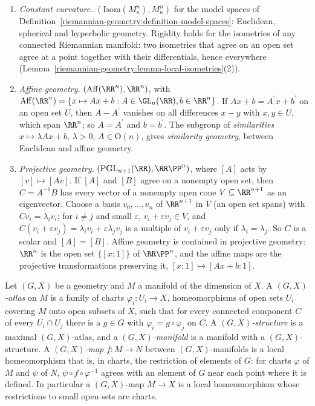 \begin{example}\label{riemannian-geometry:example-geometries}
\begin{enumerate}
\item \emph{Constant curvature.} $(\mathrm{Isom}(M^n_\kappa), M^n_\kappa)$ for the model spaces of Definition~\ref{riemannian-geometry:definition-model-spaces}: Euclidean, spherical and hyperbolic geometry. Rigidity holds for the
isometries of any connected Riemannian manifold: two isometries that agree on an open set agree at a point together with their differentials, hence everywhere (Lemma~\ref{riemannian-geometry:lemma-local-isometries}(2)).
\item \emph{Affine geometry.} $(\mathrm{Aff}(\RR^n), \RR^n)$, with $\mathrm{Aff}(\RR^n) = \{x \mapsto Ax + b : A \in \GL_n(\RR), b \in \RR^n\}$. If $Ax + b = A^{\prime}x + b^{\prime}$ on an open set $U$, then $A - A^{\prime}$ vanishes on all differences
$x - y$ with $x, y \in U$, which span $\RR^n$; so $A = A^{\prime}$ and $b = b^{\prime}$. The subgroup of \emph{similarities} $x \mapsto \lambda Ax + b$, $\lambda > 0$, $A \in \mathrm{O}(n)$, gives \emph{similarity geometry}, between
Euclidean and affine geometry.
\item \emph{Projective geometry.} $(\mathrm{PGL}_{n+1}(\RR), \RR\PP^n)$, where $[A]$ acts by $[v] \mapsto [Av]$. If $[A]$ and $[B]$ agree on a nonempty open set, then $C = A^{-1}B$ has every vector of a nonempty open cone
$V \subseteq \RR^{n+1}$ as an eigenvector. Choose a basis $v_0, \ldots, v_n$ of $\RR^{n+1}$ in $V$ (an open set spans) with $Cv_i = \lambda_iv_i$; for $i \neq j$ and small $\varepsilon$, $v_i + \varepsilon v_j \in V$, and
$C(v_i + \varepsilon v_j) = \lambda_iv_i + \varepsilon\lambda_jv_j$ is a multiple of $v_i + \varepsilon v_j$ only if $\lambda_i = \lambda_j$. So $C$ is a scalar and $[A] = [B]$. Affine geometry is contained in projective geometry: $\RR^n$ is
the open set $\{[x : 1]\}$ of $\RR\PP^n$, and the affine maps are the projective transformations preserving it, $[x : 1] \mapsto [Ax + b : 1]$.
\end{enumerate}
\end{example}

\begin{definition}\label{riemannian-geometry:definition-gx-structure}
Let $(G, X)$ be a geometry and $M$ a manifold of the dimension of $X$. A \emph{$(G, X)$-atlas} on $M$ is a family of charts $\varphi_i \colon U_i \to X$, homeomorphisms of open sets $U_i$ covering $M$ onto open subsets
of $X$, such that for every connected component $C$ of every $U_i \cap U_j$ there is a $g \in G$ with $\varphi_i = g \circ \varphi_j$ on $C$. A \emph{$(G, X)$-structure} is a maximal $(G, X)$-atlas, and a
\emph{$(G, X)$-manifold} is a manifold with a $(G, X)$-structure. A \emph{$(G, X)$-map} $f \colon M \to N$ between $(G, X)$-manifolds is a local homeomorphism that is, in charts, the restriction of elements of $G$: for
charts $\varphi$ of $M$ and $\psi$ of $N$, $\psi \circ f \circ \varphi^{-1}$ agrees with an element of $G$ near each point where it is defined. In particular a $(G, X)$-map $M \to X$ is a local homeomorphism whose restrictions
to small open sets are charts.
\end{definition}

